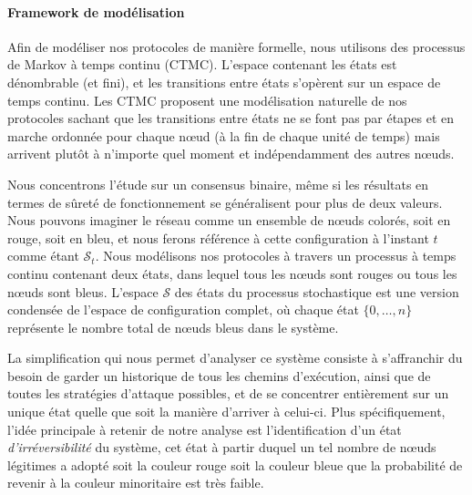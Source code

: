 \documentclass[letterpaper,twocolumn,10pt]{article}
\DeclarePairedDelimiter{\floor}{\lfloor}{\rfloor}
\theoremstyle{definition}
\begin{document}

\paragraph{Framework de modélisation} Afin de modéliser nos protocoles de manière formelle, nous utilisons des
processus de Markov à temps continu (CTMC). L'espace contenant les états est dénombrable (et fini), et les transitions
entre états s'opèrent sur un espace de temps continu. Les CTMC proposent une modélisation naturelle de nos protocoles
sachant que les transitions entre états ne se font pas par étapes et en marche ordonnée pour chaque nœud (à la fin de
chaque unité de temps) mais arrivent plutôt à n'importe quel moment et indépendamment des autres nœuds.

Nous concentrons l'étude sur un consensus binaire, même si les résultats en termes de sûreté de fonctionnement se
généralisent pour plus de deux valeurs. Nous pouvons imaginer le réseau comme un ensemble de nœuds colorés, soit en
rouge, soit en bleu, et nous ferons référence à cette configuration à l'instant $t$ comme étant $\mathcal{S}_t$.
Nous modélisons nos protocoles à travers un processus à temps continu contenant deux états, dans lequel tous les nœuds
sont rouges ou tous les nœuds sont bleus. L'espace $\mathcal{S}$ des états du processus stochastique est une version
condensée de l'espace de configuration complet, où chaque état $\{0, \dots, n\}$ représente le nombre total de nœuds
bleus dans le système.

La simplification qui nous permet d'analyser ce système consiste à s'affranchir du besoin de garder un historique de
tous les chemins d'exécution, ainsi que de toutes les stratégies d'attaque possibles, et de se concentrer 
entièrement sur un unique état quelle que soit la manière d'arriver à celui-ci. Plus spécifiquement, l'idée principale
à retenir de notre analyse est l'identification d'un état \textit{d'irréversibilité} du système, cet état à partir
duquel un tel nombre de nœuds légitimes a adopté soit la couleur rouge soit la couleur bleue que la probabilité de
revenir à la couleur minoritaire est très faible.
\end{document}
